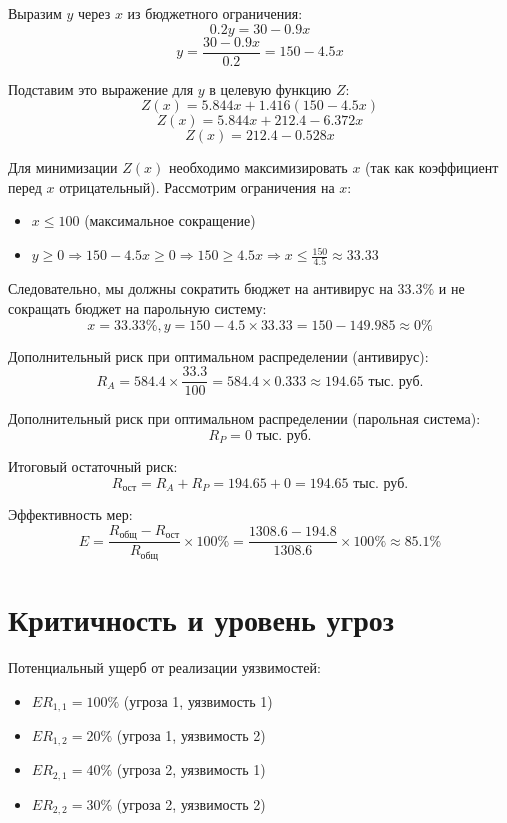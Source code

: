 \documentclass{bsuir}
\begin{document}
Выразим $y$ через $x$ из бюджетного ограничения:
$$0.2y = 30 - 0.9x$$
$$y = \frac{30 - 0.9x}{0.2} = 150 - 4.5x$$

Подставим это выражение для $y$ в целевую функцию $Z$:
$$Z(x) = 5.844x + 1.416(150 - 4.5x)$$
$$Z(x) = 5.844x + 212.4 - 6.372x$$
$$Z(x) = 212.4 - 0.528x$$

Для минимизации $Z(x)$ необходимо максимизировать $x$ (так как коэффициент перед $x$ отрицательный). Рассмотрим
ограничения на $x$:

\begin{itemize}
	\item $x \le 100$ (максимальное сокращение)
	\item $y \ge 0 \Rightarrow 150 - 4.5x \ge 0 \Rightarrow 150 \ge 4.5x \Rightarrow x \le \frac{150}{4.5} \approx 33.33$
\end{itemize}

Следовательно, мы должны сократить бюджет на антивирус на $33.3\%$ и не сокращать бюджет на парольную систему:
$$x = 33.33\%, y = 150 - 4.5 \times 33.33 = 150 - 149.985 \approx 0\%$$

Дополнительный риск при оптимальном распределении (антивирус):
$$R_A = 584.4 \times \frac{33.3}{100} = 584.4 \times 0.333 \approx 194.65 \text{ тыс. руб.}$$

Дополнительный риск при оптимальном распределении (парольная система):
$$R_P = 0 \text{ тыс. руб.}$$

Итоговый остаточный риск:
$$R_{\text{ост}} = R_A + R_P = 194.65 + 0 = 194.65 \text{ тыс. руб.}$$

Эффективность мер:
$$E = \frac{R_{\text{общ}} - R_{\text{ост}}}{R_{\text{общ}}} \times 100\% = \frac{1308.6 - 194.8}{1308.6} \times 100\% \approx 85.1\%$$

\section{Критичность и уровень угроз}

Потенциальный ущерб от реализации уязвимостей:
\begin{itemize}
	\item $ER_{1,1} = 100\%$ (угроза 1, уязвимость 1)
	\item $ER_{1,2} = 20\%$ (угроза 1, уязвимость 2)
	\item $ER_{2,1} = 40\%$ (угроза 2, уязвимость 1)
	\item $ER_{2,2} = 30\%$ (угроза 2, уязвимость 2)
\end{itemize}
\end{document}
